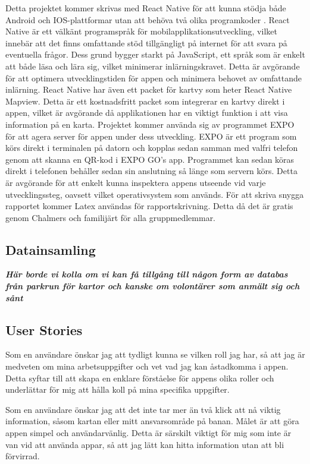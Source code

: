 Detta projektet kommer skrivas med React Native för att kunna stödja både Android och IOS-plattformar utan att behöva två olika programkoder \cite{react}. React Native är ett välkänt programspråk för mobilapplikationsutveckling, vilket innebär att det finns omfattande stöd tillgängligt på internet för att svara på eventuella frågor. Dess grund bygger starkt på JavaScript, ett språk som är enkelt att både läsa och lära sig, vilket minimerar inlärningskravet. Detta är avgörande för att optimera utvecklingstiden för appen och minimera behovet av omfattande inlärning. React Native har även ett packet för kartvy som heter React Native Mapview. Detta är ett kostnadsfritt packet som integrerar en kartvy direkt i appen, vilket är avgörande då applikationen har en viktigt funktion i att visa information på en karta. Projektet kommer använda sig av programmet EXPO för att agera server för appen under dess utveckling. EXPO är ett program som körs direkt i terminalen på datorn och kopplas sedan samman med valfri telefon genom att skanna en QR-kod i EXPO GO's app. Programmet kan sedan köras direkt i telefonen behåller sedan sin anslutning så länge som servern körs. Detta är avgörande för att enkelt kunna inspektera appens utseende vid varje utvecklingssteg, oavsett vilket operativsystem som används. För att skriva snygga rapportet kommer Latex användas för rapportskrivning. Detta då det är gratis genom Chalmers och familijärt för alla gruppmedlemmar.

\subsection{Datainsamling}

\textbf{\textit{Här borde vi kolla om vi kan få tillgång till någon form av databas från parkrun för kartor och kanske om volontärer som anmält sig och sånt}}

\subsection{User Stories}


Som en användare önskar jag att tydligt kunna se vilken roll jag har, så att jag är medveten om mina arbetsuppgifter och vet vad jag kan åstadkomma i appen. Detta syftar till att skapa en enklare förståelse för appens olika roller och underlättar för mig att hålla koll på mina specifika uppgifter.

\vspace{1em}
Som en användare önskar jag att det inte tar mer än två klick att nå viktig information, såsom kartan eller mitt ansvarsområde på banan. Målet är att göra appen simpel och användarvänlig. Detta är särskilt viktigt för mig som inte är van vid att använda appar, så att jag lätt kan hitta information utan att bli förvirrad.

